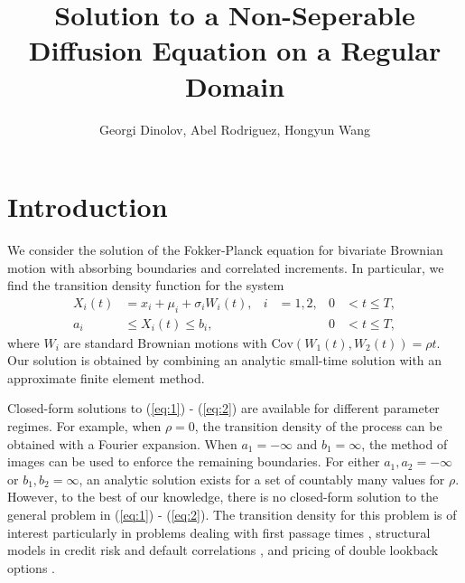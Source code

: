 \documentclass[10pt]{article}
\title{Solution to a Non-Seperable Diffusion Equation on a Regular Domain}
\author{Georgi Dinolov, Abel Rodriguez, Hongyun Wang}
\date{} %
\begin{document}
\def\spacingset#1{\renewcommand{\baselinestretch}%
{#1}\small\normalsize} \spacingset{1}

\bigskip

\vspace{1cm}
\noindent

\spacingset{1.00} %
\section{Introduction}

We consider the solution of the Fokker-Planck equation for bivariate
Brownian motion with absorbing boundaries and correlated
increments. In particular, we find the transition density function for
the system
\begin{align}
  X_i(t) &= x_i + \mu_i + \sigma_i W_i(t), & i &= 1,2, & 0 &< t \leq T,  \label{eq:1} \\
  a_i &\leq X_i(t) \leq b_i, &&  & 0 &< t \leq T,  \label{eq:2}
\end{align}
where $W_i$ are standard Brownian motions with
$\mbox{Cov}(W_1(t), W_2(t)) = \rho t$. Our solution is obtained by
combining an analytic small-time solution with an approximate finite
element method.

Closed-form solutions to (\ref{eq:1}) - (\ref{eq:2}) are available for
different parameter regimes. For example, when $\rho = 0$, the
transition density of the process can be obtained with a Fourier
expansion. When $a_1 = -\infty$ and $b_1 = \infty$, the method of
images can be used to enforce the remaining boundaries. For either
$a_1, a_2 = -\infty$ or $b_1, b_2 = \infty$, an analytic solution
exists for a set of countably many values for $\rho$. However, to the
best of our knowledge, there is no closed-form solution to the general
problem in (\ref{eq:1}) - (\ref{eq:2}). The transition density for
this problem is of interest particularly in problems dealing with
first passage times \citep{kou2016first, sacerdote2012first},
structural models in credit risk and default correlations
\citep{haworth2008modelling, ching2014correlated}, and pricing of
double lookback options \citep{he1998double}.






\end{document}
